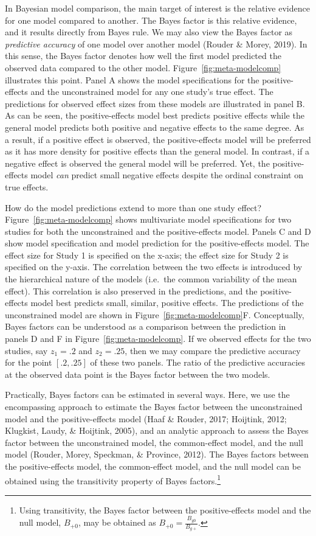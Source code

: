 \documentclass[english,,man]{apa6}
\begin{document}
In Bayesian model comparison, the main target of interest is the relative evidence for one model compared to another. The Bayes factor is this relative evidence, and it results directly from Bayes rule. We may also view the Bayes factor as \emph{predictive accuracy} of one model over another model (Rouder \& Morey, 2019). In this sense, the Bayes factor denotes how well the first model predicted the observed data compared to the other model. Figure~\ref{fig:meta-modelcomp} illustrates this point. Panel A shows the model specifications for the positive-effects and the unconstrained model for any one study's true effect. The predictions for observed effect sizes from these models are illustrated in panel B. As can be seen, the positive-effects model best predicts positive effects while the general model predicts both positive and negative effects to the same degree. As a result, if a positive effect is observed, the positive-effects model will be preferred as it has more density for positive effects than the general model. In contrast, if a negative effect is observed the general model will be preferred. Yet, the positive-effects model \emph{can} predict small negative effects despite the ordinal constraint on true effects.

How do the model predictions extend to more than one study effect? Figure~\ref{fig:meta-modelcomp} shows multivariate model specifications for two studies for both the unconstrained and the positive-effects model. Panels C and D show model specification and model prediction for the positive-effects model. The effect size for Study 1 is specified on the x-axis; the effect size for Study 2 is specified on the y-axis. The correlation between the two effects is introduced by the hierarchical nature of the models (i.e.~the common variability of the mean effect). This correlation is also preserved in the predictions, and the positive-effects model best predicts small, similar, positive effects. The predictions of the unconstrained model are shown in Figure~\ref{fig:meta-modelcomp}F. Conceptually, Bayes factors can be understood as a comparison between the prediction in panels D and F in Figure~\ref{fig:meta-modelcomp}. If we observed effects for the two studies, say \(z_1 = .2\) and \(z_2 = .25\), then we may compare the predictive accuracy for the point \([.2, .25]\) of these two panels. The ratio of the predictive accuracies at the observed data point is the Bayes factor between the two models.

Practically, Bayes factors can be estimated in several ways. Here, we use the encompassing approach to estimate the Bayes factor between the unconstrained model and the positive-effects model (Haaf \& Rouder, 2017; Hoijtink, 2012; Klugkist, Laudy, \& Hoijtink, 2005), and an analytic approach to assess the Bayes factor between the unconstrained model, the common-effect model, and the null model (Rouder, Morey, Speckman, \& Province, 2012). The Bayes factors between the positive-effects model, the common-effect model, and the null model can be obtained using the transitivity property of Bayes factors.\footnote{Using transitivity, the Bayes factor between the positive-effects model and the null model, \(B_{+0}\), may be obtained as \(B_{+0} = \frac{B_{g0}}{B_{g+}}\).}
\end{document}
